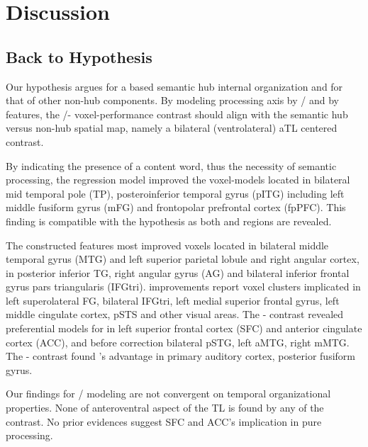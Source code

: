 \chapter{Discussion} %

\label{chap:discussions} 

\section{Back to Hypothesis}

Our hypothesis argues for a \similarity based semantic hub internal organization and \association for that of other non-hub components. By modeling \similarity processing axis by \slash {} and \association by  features, the \slash {}- voxel-performance contrast should align with the semantic hub versus non-hub spatial map, namely a bilateral (ventrolateral) aTL centered contrast. 

By indicating the presence of a content word, thus the necessity of semantic processing, the regression model improved the voxel-models located in bilateral mid temporal pole (TP), posteroinferior temporal gyrus (pITG) including left middle fusiform gyrus (mFG) and frontopolar prefrontal cortex (fpPFC). This finding is compatible with the hypothesis as both \similarity and \association regions are revealed.

The constructed  features most improved voxels located in bilateral middle temporal gyrus (MTG) and left superior parietal lobule and right angular cortex,  in posterior inferior TG, right angular gyrus (AG) and bilateral inferior frontal gyrus pars triangularis (IFGtri).  improvements report voxel clusters implicated in left superolateral FG, bilateral IFGtri, left medial superior frontal gyrus, left middle cingulate cortex, pSTS and other visual areas. The - contrast revealed preferential models for  in left superior frontal cortex (SFC) and anterior cingulate cortex (ACC), and before correction bilateral pSTG, left aMTG, right mMTG. The - contrast found 's advantage in primary auditory cortex, posterior fusiform gyrus. 

Our findings for / modeling \similarity are not convergent on temporal organizational properties. None of anteroventral aspect of the TL is found by any of the contrast. No prior evidences suggest SFC and ACC's implication in pure \similarity processing.  

